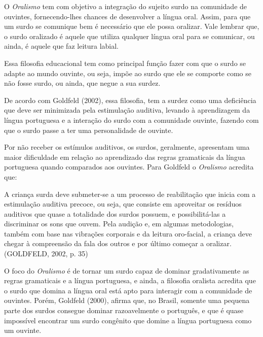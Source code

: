 \documentclass[brasil]{abnt}
\begin{document}
		 O \textit{Oralismo} tem com objetivo a integração do sujeito surdo na comunidade de ouvintes, fornecendo-lhes chances de desenvolver a língua oral. Assim, para que um surdo se comunique bem é 
		 necessário que ele possa oralizar. Vale lembrar que, o surdo oralizado é aquele que utiliza qualquer língua oral para se comunicar, ou ainda, é aquele que faz leitura labial.
		 
		 Essa filosofia educacional tem como principal função fazer com que o surdo se adapte ao mundo ouvinte, ou seja, impõe ao surdo que ele se comporte como se não fosse surdo, ou ainda, que negue a sua surdez.
		 
		 De acordo com Goldfeld (2002), essa filosofia, tem a surdez como uma deficiência que deve ser minimizada pela estimulação auditiva, levando à aprendizagem da língua portuguesa e a interação do surdo 
		 com a comunidade ouvinte, fazendo com que o surdo passe a ter uma personalidade de ouvinte.  
		 
		 Por não receber os estímulos auditivos, os surdos, geralmente, apresentam uma maior dificuldade em relação ao aprendizado das regras gramaticais da língua portuguesa quando comparados 
		 aos ouvintes. Para Goldfeld o \textit{Oralismo} acredita que:
		 
			\begin{citacao} A criança surda deve submeter-se a um processo de reabilitação que inicia com a estimulação auditiva precoce, ou seja, que consiste em aproveitar os resíduos auditivos que quase a 
							totalidade dos surdos possuem, e possibilitá-las a discriminar os sons que ouvem. Pela audição e, em algumas metodologias, também com base nas vibrações corporais e da leitura 
							oro-facial, a criança deve chegar à compreensão da fala dos outros e por último começar a oralizar. (GOLDFELD, 2002, p. 35) 
			\end{citacao}
		
		O foco do \textit{Oralismo} é de tornar um surdo capaz de dominar gradativamente as regras gramaticais e a língua portuguesa, e ainda, a filosofia oralista acredita que o surdo que domina a língua 
		oral está apto para interagir com a comunidade de ouvintes. Porém, Goldfeld (2000), afirma que, no Brasil, somente uma pequena parte dos surdos consegue dominar razoavelmente o português, e que é quase 
		impossível encontrar um surdo congênito que domine a língua portuguesa como um ouvinte.
		
		 
\end{document}
